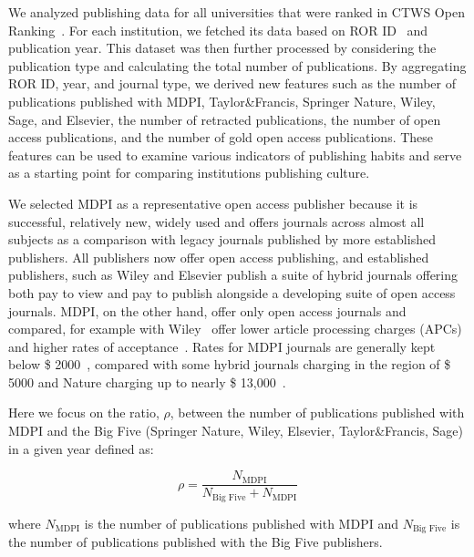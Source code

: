 \documentclass[amsfonts, amssymb, prl, superscriptaddress, notitlepage, twocolumn, nofootinbib]{revtex4-2}
\begin{document}
We analyzed publishing data for all universities that were ranked in CTWS Open Ranking~\cite{cwts2024leiden}. For each institution, we fetched its data based on ROR ID~\cite{ROR} and publication year. This dataset was then further processed by considering the publication type and calculating the total number of publications. By aggregating ROR ID, year, and journal type, we derived new features such as the number of publications published with MDPI, Taylor\&Francis, Springer Nature, Wiley, Sage, and Elsevier, the number of retracted publications, the number of open access publications, and the number of gold open access publications. These features can be used to examine various indicators of publishing habits and serve as a starting point for comparing institutions publishing culture. 

We selected MDPI as a representative open access publisher because it is successful, relatively new, widely used and offers journals across almost all subjects as a comparison with legacy journals published by more established publishers. All publishers now offer open access publishing, and established publishers, such as Wiley and Elsevier publish a suite of hybrid journals offering both pay to view and pay to publish alongside a developing suite of open access journals. MDPI, on the other hand, offer only open access journals and compared, for example with Wiley~\cite{wiley} offer lower article processing charges (APCs) and higher rates of acceptance~\cite{fillon2024should}. Rates for MDPI journals are generally kept below \$ 2000~\cite{mdpi_apc}, compared with some hybrid journals charging in the region of \$ 5000 and Nature charging up to nearly \$ 13,000~\cite{nature_publishing_options}.

Here we focus on the ratio, $\rho$, between the number of publications published with MDPI and the Big Five (Springer Nature, Wiley, Elsevier, Taylor\&Francis, Sage) in a given year defined as: 

\begin{equation}
\rho = \frac{N_{\text{MDPI}}}{N_{\text{Big Five}}+N_{\text{MDPI}}}
\end{equation}

where $N_{\text{MDPI}}$ is the number of publications published with MDPI and $N_{\text{Big Five}}$ is the number of publications published with the Big Five publishers.
\end{document}
